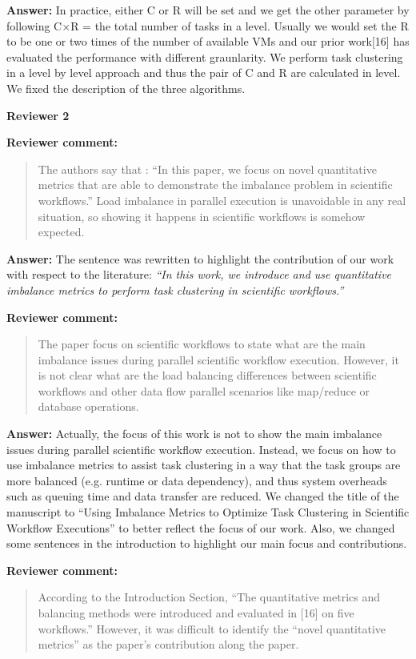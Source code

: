 \documentclass{letter}
\newenvironment{review}%
{\textbf{Reviewer comment:}\begin{quote}}%
{\end{quote}}%
\newcommand{\answer}[1]{%
      \textbf{Answer:} #1}
\newcommand{\revised}[1]{\emph{#1}\color{black}}
\begin{document}
\begin{letter}{}
\answer{In practice, either C or R will be set and we get the other parameter by following C$\times$R = the total number of tasks in a level. Usually we would set the R to be one or two times of the number of available VMs and our prior work[16] has evaluated the performance with different graunlarity. We perform task clustering in a level by level approach and thus the pair of C and R are calculated in level. We fixed the description of the three algorithms. }


\newpage

\textbf{Reviewer 2}


\begin{review}
The authors say that : ``In this paper, we focus on novel quantitative metrics that are able to demonstrate the imbalance problem in scientific workflows.'' Load imbalance in parallel execution is unavoidable in any real situation, so showing it happens in scientific workflows is somehow expected.

\end{review}

\answer{The sentence was rewritten to highlight the contribution of our work with respect to the literature:
\revised{``In this work, we introduce and use quantitative imbalance metrics to perform task clustering in scientific workflows.''}}


\begin{review}
The paper focus on scientific workflows to state what are the main imbalance issues during parallel scientific workflow execution. However, it is not clear what are the load balancing differences between scientific workflows and other data flow parallel scenarios like map/reduce or database operations.
\end{review}

\answer{Actually, the focus of this work is not to show the main imbalance issues during parallel scientific workflow execution. Instead, we focus on how to use imbalance metrics to assist task clustering in a way that the task groups are more balanced (e.g. runtime or data dependency), and thus system overheads such as queuing time and data transfer are reduced. We changed the title of the manuscript to ``Using Imbalance Metrics to Optimize Task Clustering in Scientific Workflow Executions'' to better reflect the focus of our work. Also, we changed some sentences in the introduction to highlight our main focus and contributions.}


\begin{review}
According to the Introduction Section, ``The quantitative metrics and balancing methods were introduced and evaluated in [16] on five workflows.'' However, it was difficult to identify the ``novel quantitative metrics'' as the paper's contribution along the paper. 
\end{review}


\end{letter}
\end{document}
